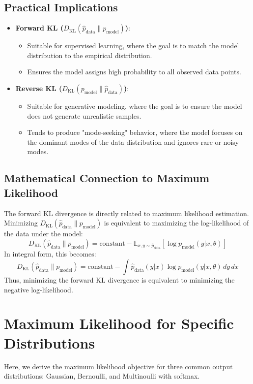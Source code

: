 \begin{notechapter}
\subsection{Practical Implications}
\begin{itemize}
    \item \textbf{Forward KL (\( D_{\text{KL}}(\hat{p}_{\text{data}} \| p_{\text{model}}) \))}:
        \begin{itemize}
            \item Suitable for supervised learning, where the goal is to match the model distribution to the empirical distribution.
            \item Ensures the model assigns high probability to all observed data points.
        \end{itemize}
    \item \textbf{Reverse KL (\( D_{\text{KL}}(p_{\text{model}} \| \hat{p}_{\text{data}}) \))}:
        \begin{itemize}
            \item Suitable for generative modeling, where the goal is to ensure the model does not generate unrealistic samples.
            \item Tends to produce "mode-seeking" behavior, where the model focuses on the dominant modes of the data distribution and ignores rare or noisy modes.
        \end{itemize}
\end{itemize}

\subsection{Mathematical Connection to Maximum Likelihood}
The forward KL divergence is directly related to maximum likelihood estimation. Minimizing \( D_{\text{KL}}(\hat{p}_{\text{data}} \| p_{\text{model}}) \) is equivalent to maximizing the log-likelihood of the data under the model:
\[
D_{\text{KL}}(\hat{p}_{\text{data}} \| p_{\text{model}}) = \text{constant} - \mathbb{E}_{x,y \sim \hat{p}_{\text{data}}} \left[ \log p_{\text{model}}(y | x, \theta) \right]
\]
In integral form, this becomes:
\[
D_{\text{KL}}(\hat{p}_{\text{data}} \| p_{\text{model}}) = \text{constant} - \int \hat{p}_{\text{data}}(y | x) \log p_{\text{model}}(y | x, \theta) \, dy \, dx
\]
Thus, minimizing the forward KL divergence is equivalent to minimizing the negative log-likelihood.

\section{Maximum Likelihood for Specific Distributions}
Here, we derive the maximum likelihood objective for three common output distributions: Gaussian, Bernoulli, and Multinoulli with softmax.


\end{notechapter}
